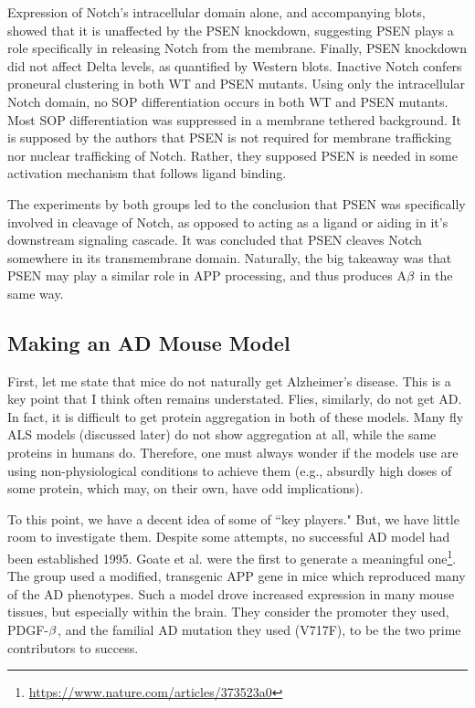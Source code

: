 Expression of Notch's intracellular domain alone, and accompanying blots, showed that it is unaffected by the PSEN knockdown, suggesting PSEN plays a role specifically in releasing Notch from the membrane. Finally, PSEN knockdown did not affect Delta levels, as quantified by Western blots. Inactive Notch confers proneural clustering in both WT and PSEN mutants. Using only the intracellular Notch domain, no SOP differentiation occurs in both WT and PSEN mutants. Most SOP differentiation was suppressed in a membrane tethered background. It is supposed by the authors that PSEN is not required for membrane trafficking nor nuclear trafficking of Notch. Rather, they supposed PSEN is needed in some activation mechanism that follows ligand binding.\newline

The experiments by both groups led to the conclusion that PSEN was specifically involved in cleavage of Notch, as opposed to acting as a ligand or aiding in it's downstream signaling cascade. It was concluded that PSEN cleaves Notch somewhere in its transmembrane domain. Naturally, the big takeaway was that PSEN may play a similar role in APP processing, and thus produces A$\beta$ in the same way.


\subsection*{Making an AD Mouse Model}

First, let me state that mice do not naturally get Alzheimer's disease. This is a key point that I think often remains understated. Flies, similarly, do not get AD. In fact, it is difficult to get protein aggregation in both of these models. Many fly ALS models (discussed later) do not show aggregation at all, while the same proteins in humans do. Therefore, one must always wonder if the models use are using non-physiological conditions to achieve them (e.g., absurdly high doses of some protein, which may, on their own, have odd implications). \newline

To this point, we have a decent idea of some of ``key players." But, we have little room to investigate them. Despite some attempts, no successful AD model had been established 1995. Goate et al. were the first to generate a meaningful one\footnote{\url{https://www.nature.com/articles/373523a0}}. The group used a modified, transgenic APP gene in mice which reproduced many of the AD phenotypes. Such a model drove increased expression in many mouse tissues, but especially within the brain. They consider the promoter they used, PDGF-$\beta$, and the familial AD mutation they used (V717F), to be the two prime contributors to success.\newline

